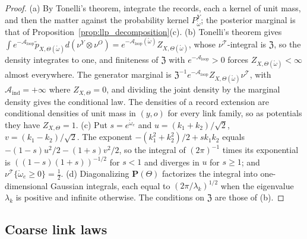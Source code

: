 \begin{proof}
(a) By Tonelli's theorem, integrate the records, each a kernel of unit mass, and then the matter against the probability kernel $P^Y_{\mathring\omega}$; the posterior marginal is that of Proposition~\ref{prop:llp_decomposition}(c).
(b) Tonelli's theorem gives $\int e^{-\mathcal A_{\mathrm{loop}}}\widetilde p_{X,\Theta(\mathring\omega)}d(\nu^Y\otimes\nu^O)=e^{-\mathcal A_{\mathrm{loop}}(\mathring\omega)}Z_{X,\Theta(\mathring\omega)}$, whose $\nu^{\mathcal T}$-integral is $\mathfrak Z$, so the density integrates to one, and finiteness of $\mathfrak Z$ with $e^{-\mathcal A_{\mathrm{loop}}}>0$ forces $Z_{X,\Theta(\mathring\omega)}<\infty$ almost everywhere. The generator marginal is $\mathfrak Z^{-1}e^{-\mathcal A_{\mathrm{loop}}}Z_{X,\Theta(\mathring\omega)}\nu^{\mathcal T}$, with $\mathcal A_{\mathrm{ind}}=+\infty$ where $Z_{X,\Theta}=0$, and dividing the joint density by the marginal density gives the conditional law. The densities of a record extension are conditional densities of unit mass in $(y,o)$ for every link family, so as potentials they have $Z_{X,\Theta}=1$.
(c) Put $s=e^{\mathring\omega_e}$ and $u=(k_1+k_2)/\sqrt2$, $v=(k_1-k_2)/\sqrt2$. The exponent $-(k_1^2+k_2^2)/2+sk_1k_2$ equals $-(1-s)u^2/2-(1+s)v^2/2$, so the integral of $(2\pi)^{-1}$ times its exponential is $((1-s)(1+s))^{-1/2}$ for $s<1$ and diverges in $u$ for $s\geq1$; and $\nu^{\mathcal T}\{\mathring\omega_e\geq0\}=\frac12$.
(d) Diagonalizing $\mathbf P(\Theta)$ factorizes the integral into one-dimensional Gaussian integrals, each equal to $(2\pi/\lambda_k)^{1/2}$ when the eigenvalue $\lambda_k$ is positive and infinite otherwise. The conditions on $\mathfrak Z$ are those of (b).
\end{proof}

\subsection{Coarse link laws}\label{app:llp_coarse}

